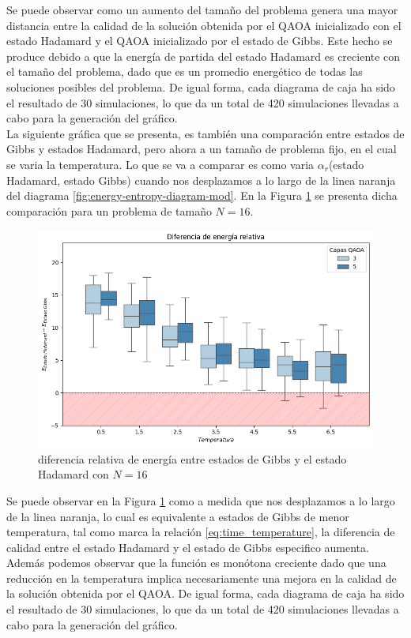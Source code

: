 Se puede observar como un aumento del tamaño del problema genera una mayor distancia entre la calidad de la solución obtenida por el QAOA inicializado con el estado Hadamard y el QAOA inicializado por el estado de Gibbs. Este hecho se produce debido a que la energía de partida del estado Hadamard es creciente con el tamaño del problema, dado que es un promedio energético de todas las soluciones posibles del problema. De igual forma, cada diagrama de caja ha sido el resultado de 30 simulaciones, lo que da un total de 420 simulaciones llevadas a cabo para la generación del gráfico. \\


La siguiente gráfica que se presenta, es también una comparación entre estados de Gibbs y estados Hadamard, pero ahora a un tamaño de problema fijo, en el cual se varia la temperatura. Lo que se va a comparar es como varia $\alpha_{r}$(estado Hadamard, estado Gibbs) cuando nos desplazamos a lo largo de la linea naranja del diagrama \ref{fig:energy-entropy-diagram-mod}. En la Figura \ref{fig:gibbs_hadamard_temperature} se presenta dicha comparación para un problema de tamaño $N=16$.

\begin{figure}[!h]
    \centering
    \includegraphics[scale = 0.75]{plt/06-gibbs_vs_hadamard_temperature.png}
    \caption{diferencia relativa de energía entre estados de Gibbs y el estado Hadamard con $N=16$}
    \label{fig:gibbs_hadamard_temperature}
\end{figure}

\newpage

Se puede observar en la Figura \ref{fig:gibbs_hadamard_temperature} como a medida que nos desplazamos a lo largo de la linea naranja, lo cual es equivalente a estados de Gibbs de menor temperatura, tal como marca la relación \ref{eq:time_temperature}, la diferencia de calidad entre el estado Hadamard y el estado de Gibbs especifico aumenta. Además podemos observar que la función es monótona creciente dado que una reducción en la temperatura implica necesariamente una mejora en la calidad de la solución obtenida por el QAOA.  De igual forma, cada diagrama de caja ha sido el resultado de 30 simulaciones, lo que da un total de 420 simulaciones llevadas a cabo para la generación del gráfico. \\

